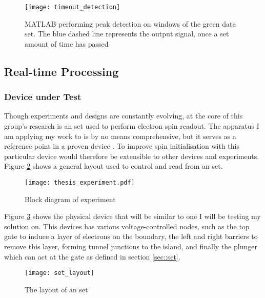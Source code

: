	\begin{figure}[htbp!]
		\centering
		\texttt{[image: timeout\_detection]}
		\caption[MATLAB windowed peak detection on generated data]{MATLAB performing peak detection on windows of the green data set. The blue dashed line represents the output signal, once a set amount of time has passed}
		\label{fig::timeout_detection}
	\end{figure}

\subsection{Real-time Processing}
	\subsubsection{Device under Test}
	\label{sec::experiment}
	Though experiments and designs are constantly evolving, at the core of this group's research is an \gls{set} used to perform electron spin readout. The apparatus I am applying my work to is by no means comprehensive, but it serves as a reference point in a proven device \cite{morello2010single}. To improve spin initialisation with this particular device would therefore be extensible to other devices and experiments.
	Figure \ref{fig::thesis_experiment} shows a general layout used to control and read from an \gls{set}.
	
	\begin{figure}[htbp!]
		\centering
		\texttt{[image: thesis\_experiment.pdf]}
		\caption{Block diagram of experiment}
		\label{fig::thesis_experiment}
	\end{figure}
	
	
	Figure \ref{fig::set_layout} shows the physical device that will be similar to one I will be testing my solution on. This devices has various voltage-controlled nodes, such as the top gate to induce a layer of electrons on the boundary, the left and right barriers to remove this layer, forming tunnel junctions to the island, and finally the plunger which can act at the gate as defined in section \ref{sec::set}.
	
	\begin{figure}[htbp!]
		\centering
		\texttt{[image: set\_layout]}
		\caption[Layout of an \gls{set}]{The layout of an \gls{set}\cite{morello2010single}}
		\label{fig::set_layout}
	\end{figure}
	
